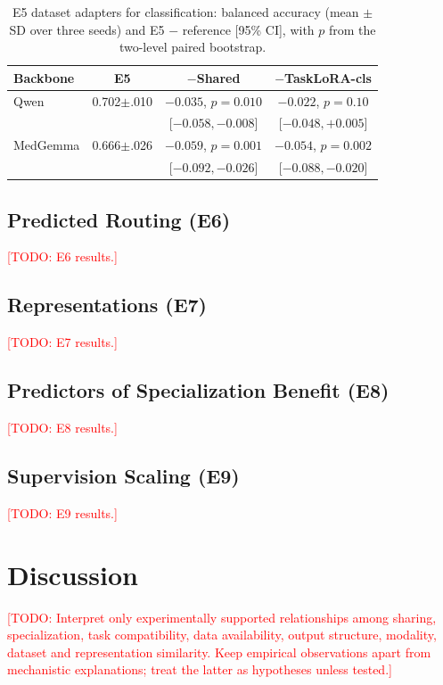 \documentclass[journal,twoside,web]{ieeecolor}
\newcommand{\todo}[1]{\textcolor{red}{[TODO: #1]}}
\begin{document}
\begin{table}[!t]
\caption{E5 dataset adapters for classification: balanced accuracy (mean
$\pm$ SD over three seeds) and E5 $-$ reference [95\% CI], with $p$ from the
two-level paired bootstrap.}
\label{tab:e5}
\centering
\footnotesize
\setlength{\tabcolsep}{3pt}
\begin{tabular}{lccc}
\toprule
Backbone & E5 & $-$Shared & $-$TaskLoRA-cls \\
\midrule
Qwen & 0.702{\scriptsize$\pm$.010} & $-0.035$, $p=0.010$ & $-0.022$, $p=0.10$ \\
 & & {\scriptsize[$-0.058,-0.008$]} & {\scriptsize[$-0.048,+0.005$]} \\[2pt]
MedGemma & 0.666{\scriptsize$\pm$.026} & $-0.059$, $p=0.001$ & $-0.054$, $p=0.002$ \\
 & & {\scriptsize[$-0.092,-0.026$]} & {\scriptsize[$-0.088,-0.020$]} \\
\bottomrule
\end{tabular}
\end{table}

\subsection{Predicted Routing (E6)}
\todo{E6 results.}

\subsection{Representations (E7)}
\todo{E7 results.}

\subsection{Predictors of Specialization Benefit (E8)}
\todo{E8 results.}

\subsection{Supervision Scaling (E9)}
\todo{E9 results.}


\section{Discussion}
\label{sec:discussion}

\todo{Interpret only experimentally supported relationships among sharing,
specialization, task compatibility, data availability, output structure,
modality, dataset and representation similarity. Keep empirical
observations apart from mechanistic explanations; treat the latter as
hypotheses unless tested.}
\end{document}
